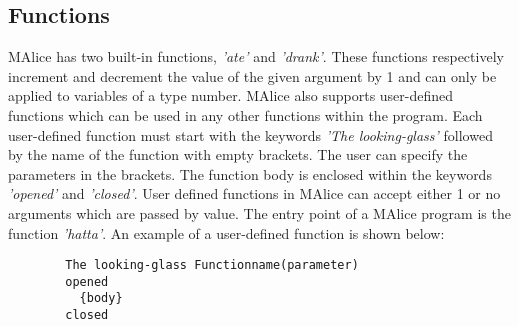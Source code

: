 \documentclass[a4wide, 11pt]{article}
\begin{document}
	\subsection{Functions}
	\label{sec:func}
		MAlice has two built-in functions, \emph{'ate'} and \emph{'drank'}. These
		functions respectively increment and decrement the value of the given argument by 1 and 
		can only be applied to variables of a type number.
		MAlice also supports user-defined functions which can be used in any other functions
		within the program. Each user-defined function must start with the keywords
		\emph{'The looking-glass'} followed by the name of the function with empty brackets. The user can 
	 	specify the parameters in the brackets.	The function body is enclosed within the keywords \emph{'opened'}
		and \emph{'closed'}. User defined functions in MAlice can accept either 1 or no 
		arguments which are passed by value. The entry point of a MAlice program is the function \emph{'hatta'}. 
		An example of a user-defined function is shown below:
		\begin{verbatim}
		The looking-glass Functionname(parameter)
		opened
		  {body}
		closed
		\end{verbatim}
	\newpage
\end{document}
